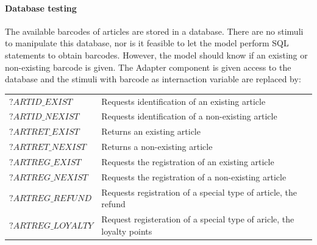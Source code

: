 \paragraph*{Database testing} The available barcodes of articles are stored in a database. There are no stimuli to manipulate this database, nor is it feasible to let the model perform SQL statements to obtain barcodes. However, the model should know if an existing or non-existing barcode is given. The Adapter component is given access to the database and the stimuli with barcode as internaction variable are replaced by:
\vspace{5px}\\
\begin{tabular}{ll}
$\mathit{?ARTID\_EXIST}$ & Requests identification of an existing article \\
$\mathit{?ARTID\_NEXIST}$ & Requests identification of a non-existing article \\
$\mathit{?ARTRET\_EXIST}$ & Returns an existing article \\
$\mathit{?ARTRET\_NEXIST}$ & Returns a non-existing article \\
$\mathit{?ARTREG\_EXIST}$ & Requests the registration of an existing article \\
$\mathit{?ARTREG\_NEXIST}$ & Requests the registration of a non-existing article \\
$\mathit{?ARTREG\_REFUND}$ & Requests registration of a special type of article, the refund \\
$\mathit{?ARTREG\_LOYALTY}$ & Request registeration of a special type of aricle, the loyalty points \\
\end{tabular}

